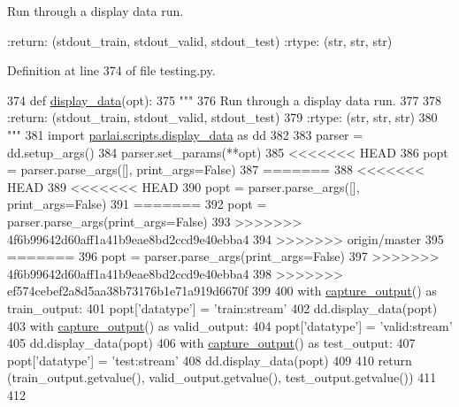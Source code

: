 \begin{DoxyVerb}Run through a display data run.

:return: (stdout_train, stdout_valid, stdout_test)
:rtype: (str, str, str)
\end{DoxyVerb}
 

Definition at line 374 of file testing.\+py.


\begin{DoxyCode}
374 \textcolor{keyword}{def }\hyperlink{namespaceparlai_1_1utils_1_1testing_a30c532f112f9beddd873382e649b3ecd}{display\_data}(opt):
375     \textcolor{stringliteral}{"""}
376 \textcolor{stringliteral}{    Run through a display data run.}
377 \textcolor{stringliteral}{}
378 \textcolor{stringliteral}{    :return: (stdout\_train, stdout\_valid, stdout\_test)}
379 \textcolor{stringliteral}{    :rtype: (str, str, str)}
380 \textcolor{stringliteral}{    """}
381     \textcolor{keyword}{import} \hyperlink{namespaceparlai_1_1scripts_1_1display__data}{parlai.scripts.display\_data} \textcolor{keyword}{as} dd
382 
383     parser = dd.setup\_args()
384     parser.set\_params(**opt)
385 <<<<<<< HEAD
386     popt = parser.parse\_args([], print\_args=\textcolor{keyword}{False})
387 =======
388 <<<<<<< HEAD
389 <<<<<<< HEAD
390     popt = parser.parse\_args([], print\_args=\textcolor{keyword}{False})
391 =======
392     popt = parser.parse\_args(print\_args=\textcolor{keyword}{False})
393 >>>>>>> 4f6b99642d60aff1a41b9eae8bd2ccd9e40ebba4
394 >>>>>>> origin/master
395 =======
396     popt = parser.parse\_args(print\_args=\textcolor{keyword}{False})
397 >>>>>>> 4f6b99642d60aff1a41b9eae8bd2ccd9e40ebba4
398 >>>>>>> ef574cebef2a8d5aa38b73176b1e71a919d6670f
399 
400     with \hyperlink{namespaceparlai_1_1utils_1_1testing_ab00d4d693202afab92c06387aa50699b}{capture\_output}() \textcolor{keyword}{as} train\_output:
401         popt[\textcolor{stringliteral}{'datatype'}] = \textcolor{stringliteral}{'train:stream'}
402         dd.display\_data(popt)
403     with \hyperlink{namespaceparlai_1_1utils_1_1testing_ab00d4d693202afab92c06387aa50699b}{capture\_output}() \textcolor{keyword}{as} valid\_output:
404         popt[\textcolor{stringliteral}{'datatype'}] = \textcolor{stringliteral}{'valid:stream'}
405         dd.display\_data(popt)
406     with \hyperlink{namespaceparlai_1_1utils_1_1testing_ab00d4d693202afab92c06387aa50699b}{capture\_output}() \textcolor{keyword}{as} test\_output:
407         popt[\textcolor{stringliteral}{'datatype'}] = \textcolor{stringliteral}{'test:stream'}
408         dd.display\_data(popt)
409 
410     \textcolor{keywordflow}{return} (train\_output.getvalue(), valid\_output.getvalue(), test\_output.getvalue())
411 
412 
\end{DoxyCode}
\mbox{\label{namespaceparlai_1_1utils_1_1testing_a1b41200277931b2e4e684dc9452889a9}} 
